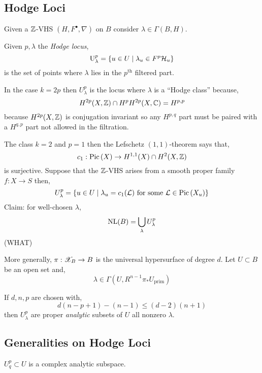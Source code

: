\documentclass[12pt]{article}
\begin{document}
\subsection{Hodge Loci}

Given a $\mathbb{Z}$-VHS $(H, F^\bullet, \nabla)$ on $B$ consider $\lambda \in \Gamma(B, H)$.

\begin{defn}
Given $p, \lambda$ the \textit{Hodge locus},
\[ \mathrm{U}^p_\lambda = \{ u \in U \mid \lambda_u \in F^p \mathcal{H}_u \} \]
is the set of points where $\lambda$ lies in the $p^{\text{th}}$ filtered part.
\end{defn}

\begin{rmk}
In the case $k = 2p$ then $U^p_\lambda$ is the locus where $\lambda$ is a ``Hodge class'' because,
\[ H^{2p}(X, \mathbb{Z}) \cap H^p H^{2p}(X, \mathbb{C}) = H^{p,p} \]
because $H^{2p}(X, \mathbb{Z})$ is conjugation invariant so any $H^{p,q}$ part must be paired with a $H^{q,p}$ part not allowed in the filtration. 
\end{rmk}

\begin{rmk}
The class $k = 2$ and $p = 1$ then the Lefschetz $(1,1)$-theorem says that,
\[ c_1 : \mathrm{Pic} \left( X \right) \to H^{1,1}(X) \cap H^2(X, \mathbb{Z}) \]
is surjective. Suppose that the $\mathbb{Z}$-VHS arises from a smooth proper family $f : X \to S$ then,
\[ U^p_\lambda = \{ u \in U \mid \lambda_u = c_1(\mathcal{L}) \text{ for some } \mathcal{L} \in \mathrm{Pic} \left( X_u \right) \} \]
Claim: for well-chosen $\lambda$,
\[ \mathrm{NL}(B) = \bigcup_{\lambda} U^p_\lambda \]
(WHAT)
\end{rmk}

More generally, $\pi : \mathscr{X}_B \to B$ is the universal hypersurface of degree $d$. Let $U \subset B$ be an open set and,
\[ \lambda \in \Gamma(U, R^{n-1} \pi_* U_{\text{prim}}) \]

\begin{theorem}
If $d,n,p$ are chosen with,
\[ d(n - p + 1) - (n-1) \le (d-2) (n+1) \]
then $U^p_\lambda$ are proper \textit{analytic} subsets of $U$ all nonzero $\lambda$. 
\end{theorem}

\subsection{Generalities on Hodge Loci}

\begin{lemma}
$U^p_q \subset U$ is a complex analytic subspace. 
\end{lemma}
\end{document}
